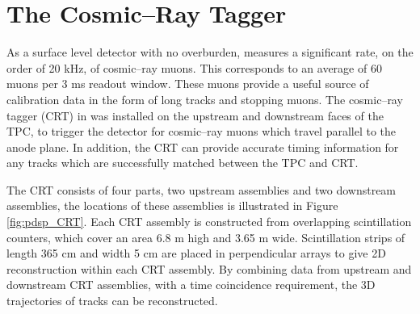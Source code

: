 \section{The Cosmic--Ray Tagger} \label{sec:pdsp_cosmic}

As a surface level detector with no overburden, \protodune{} measures a
significant rate, on the order of 20 kHz, of cosmic--ray muons. This corresponds
to an average of 60 muons per 3 ms readout window. These muons provide a 
useful source of calibration data in the form of long tracks and stopping 
muons. The cosmic--ray tagger (CRT) in \protodune{} was installed on the 
upstream and downstream faces of the TPC, to trigger the detector for 
cosmic--ray muons which travel parallel to the anode plane. In addition, the 
CRT can provide accurate timing information for any tracks which are
successfully matched between the TPC and CRT.

The CRT consists of four parts, two upstream assemblies and two downstream
assemblies, the locations of these assemblies is illustrated in Figure
\ref{fig:pdsp_CRT}. Each CRT assembly is constructed from overlapping 
scintillation counters, which cover an area 6.8 m high and 3.65 m wide. 
Scintillation strips of length 365 cm and width 5 cm are placed in 
perpendicular arrays to give 2D reconstruction within each CRT 
assembly. By combining data from upstream and downstream CRT assemblies, with a 
time coincidence requirement, the 3D trajectories of tracks can be 
reconstructed.

